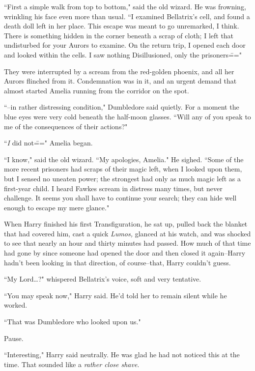 ``First a simple walk from top to bottom," said the old wizard. He was frowning, wrinkling his face even more than usual. ``I examined Bellatrix's cell, and found a death doll left in her place. This escape was meant to go unremarked, I think. There is something hidden in the corner beneath a scrap of cloth; I left that undisturbed for your Aurors to examine. On the return trip, I opened each door and looked within the cells. I saw nothing Disillusioned, only the prisoners\==="

They were interrupted by a scream from the red-golden phoenix, and all her Aurors flinched from it. Condemnation was in it, and an urgent demand that almost started Amelia running from the corridor on the spot.

``\---in rather distressing condition," Dumbledore said quietly. For a moment the blue eyes were very cold beneath the half-moon glasses. ``Will any of you speak to me of the consequences of their actions?"

``\emph{I} did not\===" Amelia began.

``I know," said the old wizard. ``My apologies, Amelia." He sighed. ``Some of the more recent prisoners had scraps of their magic left, when I looked upon them, but I sensed no uneaten power; the strongest had only as much magic left as a first-year child. I heard Fawkes scream in distress many times, but never challenge. It seems you shall have to continue your search; they can hide well enough to escape my mere glance."

\later

When Harry finished his first Transfiguration, he sat up, pulled back the blanket that had covered him, cast a quick \emph{Lumos,} glanced at his watch, and was shocked to see that nearly an hour and thirty minutes had passed. How much of that time had gone by since someone had opened the door and then closed it again\---Harry hadn't been looking in that direction, of course\---that, Harry couldn't guess.

``My Lord{\ldots}?" whispered Bellatrix's voice, soft and very tentative.

``You may speak now," Harry said. He'd told her to remain silent while he worked.

``That was Dumbledore who looked upon us."

Pause.

``Interesting," Harry said neutrally. He was glad he had not noticed this at the time. That sounded like a \emph{rather close shave}.

